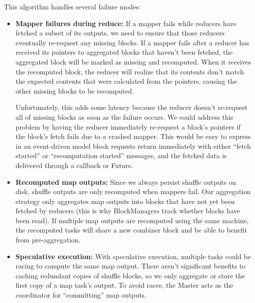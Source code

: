 \documentclass[12pt]{article}
\begin{document}
This algorithm handles several failure modes:

\begin{itemize}
   \item \textbf{Mapper failures during reduce:} If a mapper fails while
   reducers have fetched a subset of its outputs, we need to ensure that those
   reducers eventually re-request any missing blocks.  If a mapper fails after
   a reducer has received its pointers to aggregated blocks that haven't been
   fetched, the aggregated block will be marked as missing and recomputed.
   When it receives the recomputed block, the reducer will realize that its
   contents don't match the expected contents that were calculated from the
   pointers, causing the other missing blocks to be recomputed.

   Unfortunately, this adds some latency because the reducer doesn't
   re-request all of missing blocks as soon as the failure occurs.  We could
   address this problem by having the reducer immediately re-request a block's
   pointers if the block's fetch fails due to a crashed mapper.  This would be
   easy to express in an event-driven model block requests return
   immediately with either ``fetch started'' or ``recomputation started''
   messages, and the fetched data is delivered through a callback or Future.

   \item \textbf{Recomputed map outputs:} Since we always
   persist shuffle outputs on disk, shuffle outputs are only recomputed when
   mappers fail.  Our aggregation strategy only aggregates map outputs into
   blocks that have not yet been fetched by reducers (this is why
   BlockManagers track whether blocks have been read).  If multiple map
   outputs are recomputed using the same machine, the recomputed tasks will
   share a new combiner block and be able to benefit from pre-aggregation.

   \item \textbf{Speculative execution:} With speculative execution, multiple
   tasks could be racing to compute the same map output.  There aren't
   significant benefits to caching redundant copies of shuffle blocks, so we
   only aggregate or store the first copy of a map task's output.  To avoid
   races, the Master acts as the coordinator for ``committing'' map outputs.



\end{itemize}
\end{document}
